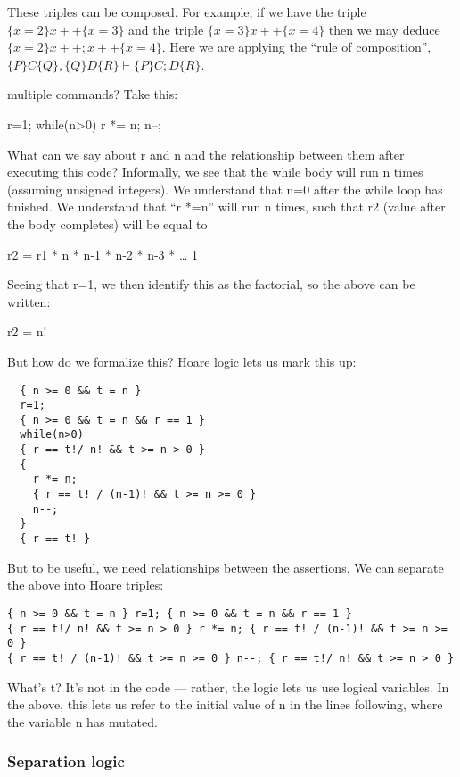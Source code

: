 These triples can be composed.
For example,
  if we have the triple $\{ x = 2 \} x++ \{ x = 3 \}$
  and the triple $\{ x = 3 \} x++ \{ x = 4 \}$
  then we may deduce $\{ x = 2 \} x++; x++ \{ x = 4 \}$.
Here we are applying
  the \enquote{rule of composition},
  $\{P\} C \{Q\}, \{Q\} D \{R\} \vdash \{P\} C; D \{R\}$.

 multiple commands?  Take this:

  r=1;
  while(n>0) {
    r *= n;
    n--;
  }

What can we say about r and n
  and the relationship between them
  after executing this code?
Informally,
  we see that the while body will run n times (assuming unsigned integers).
We understand that n=0 after the while loop has finished.
We understand that “r *=n” will run n times,
  such that r2 (value after the body completes) will be equal to

  r2 = r1 * n * n-1 * n-2 * n-3 * … 1

Seeing that r=1, we then identify this as the factorial, so the above can be written:

  r2 = n!

But how do we formalize this?
Hoare logic lets us mark this up:

\begin{lstlisting}
  { n >= 0 && t = n }
  r=1;
  { n >= 0 && t = n && r == 1 }
  while(n>0)
  { r == t!/ n! && t >= n > 0 }
  {
    r *= n;
    { r == t! / (n-1)! && t >= n >= 0 }
    n--;
  }
  { r == t! }
\end{lstlisting}

But to be useful,
we need relationships between the assertions.
We can separate the above into Hoare triples:

\begin{lstlisting}
{ n >= 0 && t = n } r=1; { n >= 0 && t = n && r == 1 }
{ r == t!/ n! && t >= n > 0 } r *= n; { r == t! / (n-1)! && t >= n >= 0 }
{ r == t! / (n-1)! && t >= n >= 0 } n--; { r == t!/ n! && t >= n > 0 }
\end{lstlisting}

What’s t?  It’s not in the code — rather, the logic lets us use logical variables.  In the above, this lets us refer to the initial value of n in the lines following, where the variable n has mutated.


\subsubsection{Separation logic}

